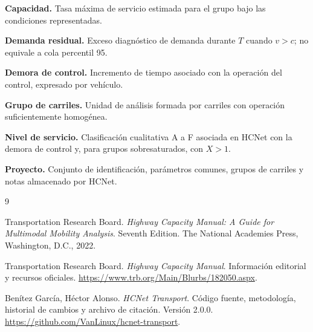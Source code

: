 \documentclass[11pt,letterpaper,oneside,openany]{report}
\newcommand{\softwareVersion}{2.0.0}
\newcommand{\repositoryURL}{https://github.com/VanLinux/hcnet-transport}
\begin{document}
\textbf{Capacidad.} Tasa máxima de servicio estimada para el grupo bajo las
condiciones representadas.

\textbf{Demanda residual.} Exceso diagnóstico de demanda durante $T$ cuando
$v>c$; no equivale a cola percentil 95.

\textbf{Demora de control.} Incremento de tiempo asociado con la operación del
control, expresado por vehículo.

\textbf{Grupo de carriles.} Unidad de análisis formada por carriles con operación
suficientemente homogénea.

\textbf{Nivel de servicio.} Clasificación cualitativa A a F asociada en HCNet con
la demora de control y, para grupos sobresaturados, con $X>1$.

\textbf{Proyecto.} Conjunto de identificación, parámetros comunes, grupos de
carriles y notas almacenado por HCNet.

\clearpage
{}
{}
\begin{thebibliography}{9}

Transportation Research Board.
\textit{Highway Capacity Manual: A Guide for Multimodal Mobility Analysis}.
Seventh Edition. The National Academies Press, Washington, D.C., 2022.

Transportation Research Board.
\textit{Highway Capacity Manual}. Información editorial y recursos oficiales.
\url{https://www.trb.org/Main/Blurbs/182050.aspx}.

Benítez García, Héctor Alonso.
\textit{HCNet Transport}. Código fuente, metodología, historial de cambios y
archivo de citación. Versión \softwareVersion.
\url{\repositoryURL}.

\end{thebibliography}
\end{document}
